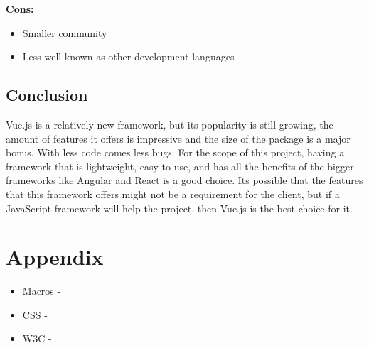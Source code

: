 \documentclass[draftclsnofoot,onecolumn,letterpaper,10pt,compsoc]{IEEEtran}
\begin{document}
    \textbf{Cons:}
    \begin{itemize}
      \item Smaller community
      \item Less well known as other development languages
    \end{itemize}

  \subsection{Conclusion}
  Vue.js is a relatively new framework, but its popularity is still growing, the amount of features it offers is impressive and the size of the package is a major bonus.
  With less code comes less bugs.
  For the scope of this project, having a framework that is lightweight, easy to use, and has all the benefits of the bigger frameworks like Angular and React is a good choice.
  Its possible that the features that this framework offers might not be a requirement for the client, but if a JavaScript framework will help the project, then Vue.js is the best choice for it.

\section{Appendix}

\begin{itemize}
  \item Macros -
  \item CSS -
  \item W3C -
\end{itemize}


\clearpage


{}

\end{document}
